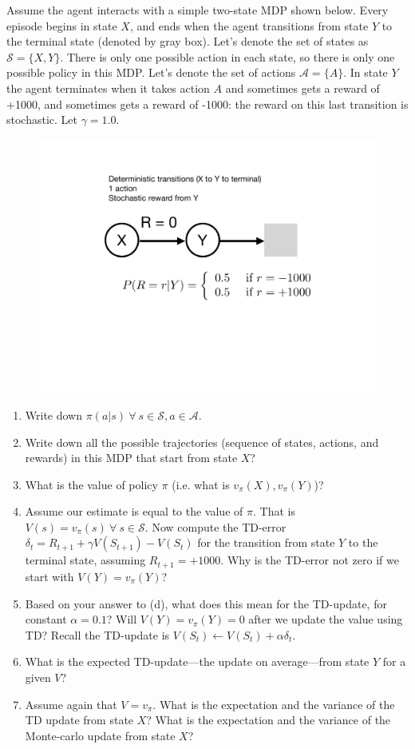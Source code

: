 Assume the agent interacts with a simple two-state MDP shown below. Every episode begins in state $X$, and ends when the agent transitions from state $Y$ to the terminal state (denoted by gray box). Let's denote the set of states as $\mathcal{S} = \{X,Y\}$. There is only one possible action in each state, so there is only one possible policy in this MDP. Let's denote the set of actions $\mathcal{A} = \{A\}$. In state $Y$ the agent terminates when it takes action $A$ and sometimes gets a reward of +1000, and sometimes gets a reward of -1000: the reward on this last transition is stochastic. Let $\gamma = 1.0$. 
\begin{figure}[h!]
  \center
\includegraphics[width=0.5\linewidth]{figures/c2m2_xy.pdf}
\end{figure}
%
\begin{enumerate}
%
\item Write down $\pi(a|s) ~\forall~ s\in\mathcal{S}, a\in\mathcal{A}$.
\item Write down all the possible trajectories (sequence of states, actions, and rewards) in this MDP that start from state $X$?
\item What is the value of policy $\pi$ (i.e. what is $v_\pi(X), v_\pi(Y)$)?
\item Assume our estimate is equal to the value of $\pi$. That is $V(s) = v_\pi(s) ~\forall~ s\in\mathcal{S}$. Now compute the TD-error $\delta_t = R_{t+1} + \gamma V(S_{t+1}) - V(S_t)$ for the transition from state $Y$ to the terminal state, assuming $R_{t+1} = +1000$. Why is the TD-error not zero if we start with $V(Y) = v_\pi(Y)$?
\item Based on your answer to (d), what does this mean for the TD-update, for constant $\alpha = 0.1$? Will $V(Y) = v_\pi(Y) = 0$ after we update the value using TD? Recall the TD-update is $V(S_t) \gets V(S_t) + \alpha \delta_t$.  
\item What is the expected TD-update---the update on average---from state $Y$ for a given $V$?
\item Assume again that $V=v_\pi$. What is the expectation and the variance of the TD update from state $X$? What is the expectation and the variance of the Monte-carlo update from state $X$?
\end{enumerate}

